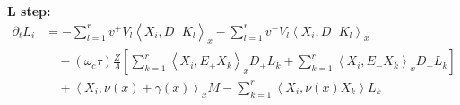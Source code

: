 \documentclass{article}
\begin{document}
\textbf{L step:}
\begin{align*}
    \partial_t L_i &= -\sum_{l=1}^r v^+ V_l \left\langle X_i, D_+ K_l \right\rangle_x - \sum_{l=1}^r v^- V_l \left\langle X_i, D_- K_l \right\rangle_x \\
                   &\quad - (\omega_c \tau) \frac{Z}{A} \left[ \sum_{k=1}^r \left\langle X_i, E_+ X_k \right\rangle_x D_+ L_k + \sum_{k=1}^r \left\langle X_i, E_- X_k \right\rangle_x D_- L_k  \right] \\
                   &\quad + \left\langle X_i, \nu(x) + \gamma(x) \right\rangle_x M - \sum_{k=1}^r \left\langle X_i, \nu(x) X_k \right\rangle L_k
\end{align*}
\end{document}

